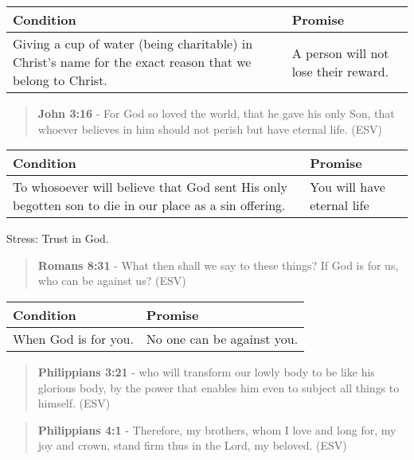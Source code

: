\documentclass[11pt]{article}
\begin{document}
\begin{center}
\begin{tabular}{ll}
Condition & Promise\\[0pt]
\hline
Giving a cup of water (being charitable) in Christ's name for the exact reason that we belong to Christ. & A person will not lose their reward.\\[0pt]
\end{tabular}
\end{center}

\begin{quote}
\textbf{John 3:16} - For God so loved the world, that he gave his only Son, that whoever believes in him should not perish but have eternal life. (ESV)
\end{quote}

\begin{center}
\begin{tabular}{ll}
Condition & Promise\\[0pt]
\hline
To whosoever will believe that God sent His only begotten son to die in our place as a sin offering. & You will have eternal life\\[0pt]
\end{tabular}
\end{center}

Stress: Trust in God.

\begin{quote}
\textbf{Romans 8:31} - What then shall we say to these things? If God is for us, who can be against us? (ESV)
\end{quote}

\begin{center}
\begin{tabular}{ll}
Condition & Promise\\[0pt]
\hline
When God is for you. & No one can be against you.\\[0pt]
\end{tabular}
\end{center}

\begin{quote}
\textbf{Philippians 3:21} - who will transform our lowly body to be like his glorious body, by the power that enables him even to subject all things to himself. (ESV)
\end{quote}

\begin{quote}
\textbf{Philippians 4:1} - Therefore, my brothers, whom I love and long for, my joy and crown, stand firm thus in the Lord, my beloved. (ESV)
\end{quote}
\end{document}
